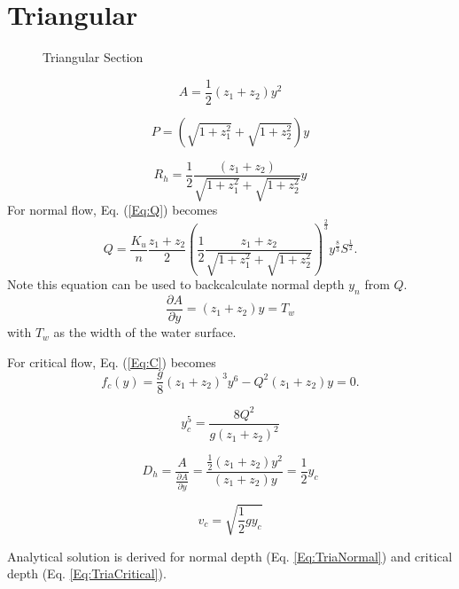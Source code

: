 \section{Triangular}

\begin{figure}[h]
\centering
{}
\caption{Triangular Section}
\end{figure}

\begin{equation}
A = \frac{1}{2} (z_1 + z_2) y^2
\end{equation}

\begin{equation}
P = \left(\sqrt{1+z_1^2} + \sqrt{1+z_2^2}\right)y
\end{equation}

\begin{equation}
R_h = \frac{1}{2}\frac{(z_1 + z_2) }{\sqrt{1+z_1^2} + \sqrt{1+z_2^2}}y
\end{equation}
For normal flow, Eq. (\ref{Eq:Q}) becomes
\begin{equation}
Q = \frac{K_u}{n} \frac{z_1 + z_2}{2}  \left(\frac{1}{2}\frac{z_1 + z_2}{\sqrt{1+z_1^2} + \sqrt{1+z_2^2}}\right)^{\frac{2}{3}} y^{\frac{8}{3}}S^{\frac{1}{2}}.
\label{Eq:TriaNormal}
\end{equation}
Note this equation can be used to backcalculate normal depth $y_n$ from $Q$.
\begin{equation}
\frac{\partial A}{\partial y} = (z_1 + z_2)y = T_w
\end{equation}
with $T_w$ as the width of the water surface.

\noindent For critical flow, Eq. (\ref{Eq:C}) becomes
\begin{equation}  
f_c(y)= \frac{g}{8}(z_1 + z_2)^3y^6 - Q^2(z_1 + z_2)y = 0.
\end{equation}

\begin{equation}  
y_c^5 = \frac{8Q^2}{g(z_1 + z_2)^2}
\label{Eq:TriaCritical}
\end{equation}

\begin{equation}  
D_h = \frac{A}{\frac{\partial A}{\partial y}} = \frac{\frac{1}{2} (z_1 + z_2) y^2}{(z_1 + z_2)y} = \frac{1}{2}y_c
\end{equation}

\begin{equation}  
v_c = \sqrt{\frac{1}{2}gy_c}
\end{equation}

\noindent Analytical solution is derived for normal depth (Eq. \ref{Eq:TriaNormal}) and critical depth (Eq. \ref{Eq:TriaCritical}).